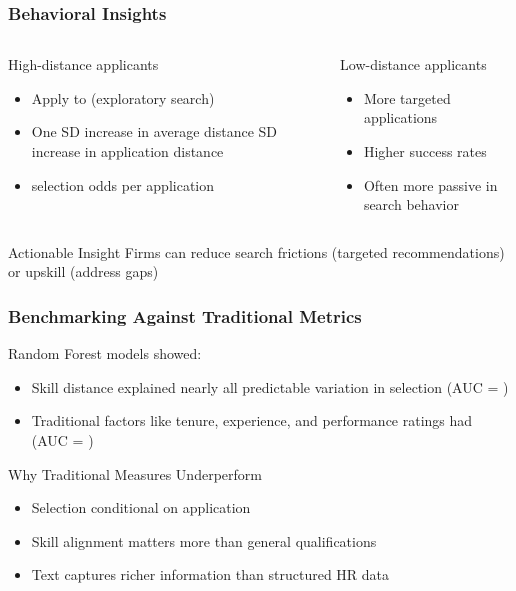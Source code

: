 \documentclass[11pt,xcolor={dvipsnames},hyperref={pdftex,pdfpagemode=UseNone,hidelinks,pdfdisplaydoctitle=true},usepdftitle=false]{beamer}
\begin{document}
\begin{frame}
\frametitle{Behavioral Insights}
\begin{columns}
\begin{column}{0.48\textwidth}
\begin{block}{High-distance applicants}
\begin{itemize}
\item Apply to  (exploratory search)
\item One SD increase in average distance  SD increase in application distance
\item {} selection odds per application
\end{itemize}
\end{block}
\end{column}

\begin{column}{0.48\textwidth}
\begin{block}{Low-distance applicants}
\begin{itemize}
\item More targeted applications
\item Higher success rates
\item Often more passive in search behavior
\end{itemize}
\end{block}
\end{column}
\end{columns}

\vspace{1em}

\begin{block}{Actionable Insight}
Firms can reduce search frictions (targeted recommendations) or upskill (address gaps)
\end{block}
\end{frame}


\begin{frame}
\frametitle{Benchmarking Against Traditional Metrics}
\begin{block}{Random Forest models showed:}
\begin{itemize}
\item Skill distance explained nearly all predictable variation in selection (AUC = )
\item Traditional factors like tenure, experience, and performance ratings had  (AUC = )
\end{itemize}
\end{block}

\begin{block}{Why Traditional Measures Underperform}
\begin{itemize}
\item Selection conditional on application
\item Skill alignment matters more than general qualifications
\item Text captures richer information than structured HR data
\end{itemize}
\end{block}
\end{frame}
\end{document}
